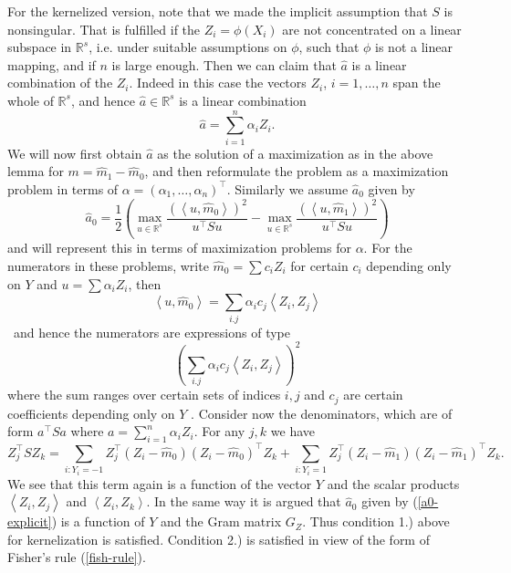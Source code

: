\documentclass[11pt,twoside]{article}%
\theoremstyle{change}
\begin{document}
For the kernelized version, note that we made the implicit assumption that $S
$ is nonsingular. That is fulfilled if the $Z_{i}=\phi(X_{i})$ are not
concentrated on a linear subspace in $\mathbb{R}^{s}$, i.e. under suitable
assumptions on $\phi$, such that $\phi$ is not a linear mapping, and if $n$ is
large enough. Then we can claim that $\hat{a}$ is a linear combination of the
$Z_{i}$. Indeed in this case the vectors $Z_{i}$, $i=1,\ldots,n$ span the
whole of $\mathbb{R}^{s}$, and hence $\hat{a}\in\mathbb{R}^{s}$ is a linear
combination
\[
\hat{a}=\sum_{i=1}^{n}\alpha_{i}Z_{i}.
\]
We will now first obtain $\hat{a}$ as the solution of a maximization as in the
above lemma for $m=\hat{m}_{1}-\hat{m}_{0}$, and then reformulate the problem
as a maximization problem in terms of $\alpha=\left(  \alpha_{1},\ldots
,\alpha_{n}\right)  ^{\top}$. Similarly we assume $\hat{a}_{0}$ given by
\begin{equation}
\hat{a}_{0}=\frac{1}{2}\left(  \max_{u\in\mathbb{R}^{s}}\frac{\left(
\left\langle u,\hat{m}_{0}\right\rangle \right)  ^{2}}{u^{\top}Su}-\max
_{u\in\mathbb{R}^{s}}\frac{\left(  \left\langle u,\hat{m}_{1}\right\rangle
\right)  ^{2}}{u^{\top}Su}\right) \label{a0-explicit}%
\end{equation}
and will represent this in terms of maximization problems for $\alpha$. For
the numerators in these problems, write $\hat{m}_{0}=\sum c_{i}Z_{i}$ for
certain $c_{i}$ depending only on $Y$ and $u=\sum\alpha_{i}Z_{i}$, then
\[
\left\langle u,\hat{m}_{0}\right\rangle =\sum_{i.j}\alpha_{i}c_{j}\left\langle
Z_{i},Z_{j}\right\rangle
\]
\ and hence the numerators are expressions of type
\[
\left(  \sum_{i.j}\alpha_{i}c_{j}\left\langle Z_{i},Z_{j}\right\rangle
\right)  ^{2}%
\]
where the sum ranges over certain sets of indices $i,j$ and $c_{j}$ are
certain coefficients depending only on $Y$ . Consider now the denominators,
which are of form $a^{\top}Sa$ where $a=\sum_{i=1}^{n}\alpha_{i}Z_{i}$. For
any $j,k$ we have
\[
Z_{j}^{\top}SZ_{k}=\sum_{i:Y_{i}=-1}Z_{j}^{\top}\left(  Z_{i}-\hat{m}%
_{0}\right)  \left(  Z_{i}-\hat{m}_{0}\right)  ^{\top}Z_{k}+\sum_{i:Y_{i}%
=1}Z_{j}^{\top}\left(  Z_{i}-\hat{m}_{1}\right)  \left(  Z_{i}-\hat{m}%
_{1}\right)  ^{\top}Z_{k}.
\]
We see that this term again is a function of the vector $Y$ and the scalar
products $\left\langle Z_{i},Z_{j}\right\rangle $ and $\left\langle
Z_{i},Z_{k}\right\rangle $. In the same way it is argued that $\hat{a}_{0}$
given by (\ref{a0-explicit}) is a function of $Y$ and the Gram matrix $G_{Z}$.
Thus condition 1.) above for kernelization is satisfied. Condition 2.) is
satisfied in view of the form of Fisher's rule (\ref{fish-rule}).
\end{document}
